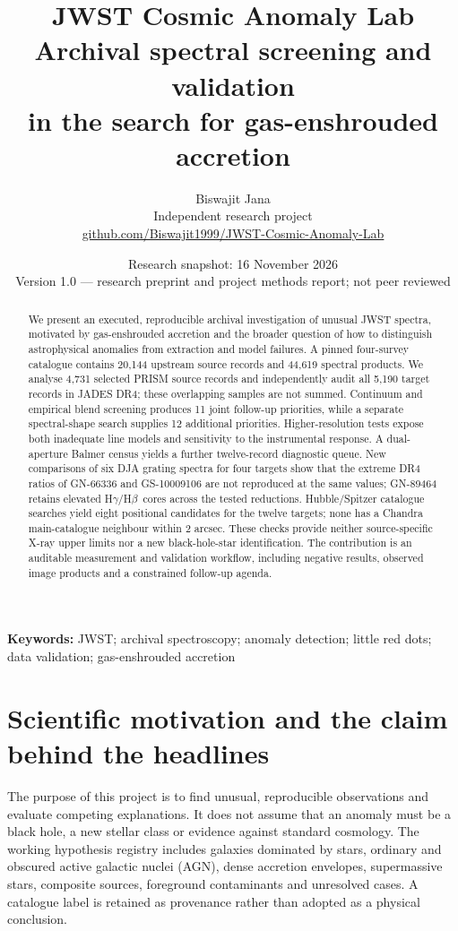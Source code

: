 \documentclass[11pt,a4paper]{article}
\title{\textbf{JWST Cosmic Anomaly Lab}\\[5pt]\Large Archival spectral screening and validation\\in the search for gas-enshrouded accretion}
\author{Biswajit Jana\\\small Independent research project\\\small\href{https://github.com/Biswajit1999/JWST-Cosmic-Anomaly-Lab}{github.com/Biswajit1999/JWST-Cosmic-Anomaly-Lab}}
\date{Research snapshot: 16 November 2026\\\small Version 1.0 --- research preprint and project methods report; not peer reviewed}
\newcommand{\hb}{H$\beta$}
\newcommand{\hg}{H$\gamma$}
\begin{document}
\maketitle
\thispagestyle{fancy}
\begin{abstract}
We present an executed, reproducible archival investigation of unusual JWST spectra, motivated by gas-enshrouded accretion and the broader question of how to distinguish astrophysical anomalies from extraction and model failures. A pinned four-survey catalogue contains 20,144 upstream source records and 44,619 spectral products. We analyse 4,731 selected PRISM source records and independently audit all 5,190 target records in JADES DR4; these overlapping samples are not summed. Continuum and empirical blend screening produces 11 joint follow-up priorities, while a separate spectral-shape search supplies 12 additional priorities. Higher-resolution tests expose both inadequate line models and sensitivity to the instrumental response. A dual-aperture Balmer census yields a further twelve-record diagnostic queue. New comparisons of six DJA grating spectra for four targets show that the extreme DR4 ratios of GN-66336 and GS-10009106 are not reproduced at the same values; GN-89464 retains elevated \hg/\hb\ cores across the tested reductions. Hubble/Spitzer catalogue searches yield eight positional candidates for the twelve targets; none has a Chandra main-catalogue neighbour within 2 arcsec. These checks provide neither source-specific X-ray upper limits nor a new black-hole-star identification. The contribution is an auditable measurement and validation workflow, including negative results, observed image products and a constrained follow-up agenda.
\end{abstract}
\textbf{Keywords:} JWST; archival spectroscopy; anomaly detection; little red dots; data validation; gas-enshrouded accretion

\section{Scientific motivation and the claim behind the headlines}
The purpose of this project is to find unusual, reproducible observations and evaluate competing explanations. It does not assume that an anomaly must be a black hole, a new stellar class or evidence against standard cosmology. The working hypothesis registry includes galaxies dominated by stars, ordinary and obscured active galactic nuclei (AGN), dense accretion envelopes, supermassive stars, composite sources, foreground contaminants and unresolved cases. A catalogue label is retained as provenance rather than adopted as a physical conclusion.
\end{document}
